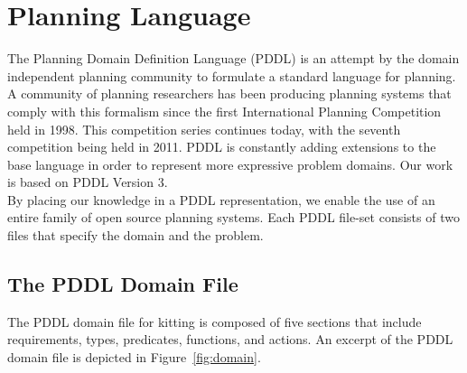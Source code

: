 
\section{Planning Language}\label{S:PDDL}
The Planning Domain Definition Language (PDDL) \cite{PDDL} is an attempt by the domain independent planning community to formulate a standard language for planning. A community of planning researchers has been producing planning systems that comply with this formalism since the first International Planning Competition held in 1998. This competition series
continues today, with the seventh competition being held in 2011. PDDL is constantly adding extensions to the base language in order to represent more expressive problem domains. Our work is based on PDDL Version 3.\\
By placing our knowledge in a PDDL representation, we enable the use of an entire family of open source planning systems.
Each PDDL file-set consists of two files that specify the domain and the problem.

\subsection{The PDDL Domain File}\label{S:PDDL-domain}
The PDDL domain file for kitting is composed of five sections that include requirements, types, predicates, functions, and actions. An excerpt of the PDDL domain file is depicted in Figure~\ref{fig:domain}.

